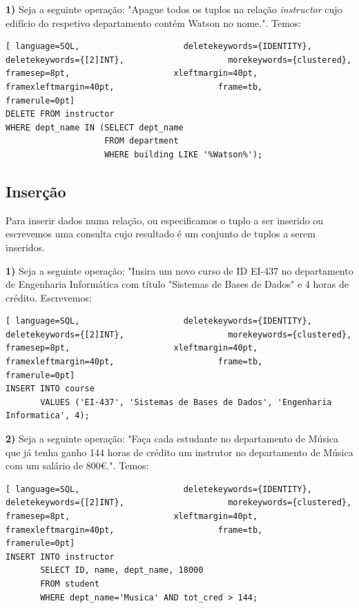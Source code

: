 \documentclass[oneside]{book}
\theoremstyle{definition}
\begin{document}
\textbf{1)} Seja a seguinte operação: "Apague todos os tuplos na relação \textit{instructor} cujo edifício do respetivo departamento contém Watson no nome.". Temos:
\begin{lstlisting}[ language=SQL,                     deletekeywords={IDENTITY},                     deletekeywords={[2]INT},                     morekeywords={clustered},                     framesep=8pt,                     xleftmargin=40pt,                     framexleftmargin=40pt,                     frame=tb,                     framerule=0pt]
DELETE FROM instructor
WHERE dept_name IN (SELECT dept_name
                    FROM department
                    WHERE building LIKE '%Watson%');
\end{lstlisting}

\subsection{Inserção}
Para inserir dados numa relação, ou especificamos o tuplo a ser inserido ou escrevemos uma consulta cujo resultado é um conjunto de tuplos a serem inseridos.

\textbf{1)} Seja a seguinte operação: "Insira um novo curso de ID EI-437 no departamento de Engenharia Informática com título "Sistemas de Bases de Dados" e 4 horas de crédito. Escrevemos:
\begin{lstlisting}[ language=SQL,                     deletekeywords={IDENTITY},                     deletekeywords={[2]INT},                     morekeywords={clustered},                     framesep=8pt,                     xleftmargin=40pt,                     framexleftmargin=40pt,                     frame=tb,                     framerule=0pt]
INSERT INTO course
       VALUES ('EI-437', 'Sistemas de Bases de Dados', 'Engenharia Informatica', 4);
\end{lstlisting}

\textbf{2)} Seja a seguinte operação: "Faça cada estudante no departamento de Música que já tenha ganho 144 horas de crédito um instrutor no departamento de Música com um salário de 800€.". Temos:
\begin{lstlisting}[ language=SQL,                     deletekeywords={IDENTITY},                     deletekeywords={[2]INT},                     morekeywords={clustered},                     framesep=8pt,                     xleftmargin=40pt,                     framexleftmargin=40pt,                     frame=tb,                     framerule=0pt]
INSERT INTO instructor
       SELECT ID, name, dept_name, 18000
       FROM student
       WHERE dept_name='Musica' AND tot_cred > 144;
\end{lstlisting}
\end{document}
